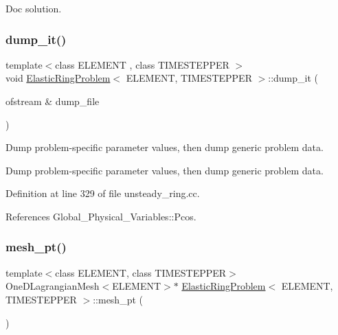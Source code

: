 Doc solution. 

\mbox{\label{classElasticRingProblem_a5d932c03b49cb7fe4da256a5c3c9be26}} 
\subsubsection{\texorpdfstring{dump\+\_\+it()}{dump\_it()}}
{\footnotesize\ttfamily template$<$class E\+L\+E\+M\+E\+NT , class T\+I\+M\+E\+S\+T\+E\+P\+P\+ER $>$ \\
void \hyperlink{classElasticRingProblem}{Elastic\+Ring\+Problem}$<$ E\+L\+E\+M\+E\+NT, T\+I\+M\+E\+S\+T\+E\+P\+P\+ER $>$\+::dump\+\_\+it (\begin{DoxyParamCaption}\item[{ofstream \&}]{dump\+\_\+file }\end{DoxyParamCaption})}



Dump problem-\/specific parameter values, then dump generic problem data. 

Dump problem-\/specific parameter values, then dump generic problem data. 

Definition at line 329 of file unsteady\+\_\+ring.\+cc.



References Global\+\_\+\+Physical\+\_\+\+Variables\+::\+Pcos.

\mbox{\label{classElasticRingProblem_a763200d4985bca4a120f2be2a217f4a8}} 
\subsubsection{\texorpdfstring{mesh\+\_\+pt()}{mesh\_pt()}\hspace{0.1cm}{\footnotesize\ttfamily [1/2]}}
{\footnotesize\ttfamily template$<$class E\+L\+E\+M\+E\+NT, class T\+I\+M\+E\+S\+T\+E\+P\+P\+ER$>$ \\
One\+D\+Lagrangian\+Mesh$<$E\+L\+E\+M\+E\+NT$>$$\ast$ \hyperlink{classElasticRingProblem}{Elastic\+Ring\+Problem}$<$ E\+L\+E\+M\+E\+NT, T\+I\+M\+E\+S\+T\+E\+P\+P\+ER $>$\+::mesh\+\_\+pt (\begin{DoxyParamCaption}{ }\end{DoxyParamCaption})\hspace{0.3cm}{\ttfamily [inline]}}



